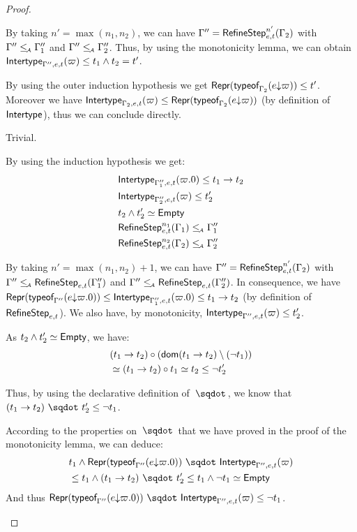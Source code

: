 \documentclass[a4paper]{article}
\theoremstyle{definition}
\begin{document}
\begin{proof}
\begin{description}
\begin{description}
      By taking $n'=\max (n_1,n_2)$,
      we can have $\Gamma'' = \RefineStep {e,t}^{n'} (\Gamma_2)$ with $\Gamma'' \leqA \Gamma_1''$ and $\Gamma'' \leqA \Gamma_2''$.
      Thus, by using the monotonicity lemma, we can obtain $\env {\Gamma'',e,t} (\varpi) \leq t_1 \land t_2 = t'$.
      \item[\Rule{PTypeof}] By using the outer induction hypothesis we get
      $\tsrep{\tyof {\occ e \varpi} {\Gamma_2}} \leq t'$.
      Moreover we have $\env {\Gamma_2,e,t} (\varpi) \leq \tsrep{\tyof {\occ e \varpi} {\Gamma_2}}$
      (by definition of $\env {}$), thus we can conclude directly.
      \item[\Rule{PEps}] Trivial.
      \item[\Rule{PAppR}] By using the induction hypothesis we get:
      \begin{align*}
        &\env {\Gamma_1'',e,t} (\varpi.0) \leq \arrow {t_1} {t_2}\\
        &\env {\Gamma_2'',e,t} (\varpi) \leq t_2'\\
        & t_2\land t_2' \simeq \Empty\\
        &\RefineStep {e,t}^{n_1} (\Gamma_1) \leqA \Gamma_1''\\
        &\RefineStep {e,t}^{n_2} (\Gamma_2) \leqA \Gamma_2''
      \end{align*}
      
      By taking $n'=\max (n_1,n_2) + 1$,
      we can have $\Gamma'' = \RefineStep {e,t}^{n'} (\Gamma_2)$ with $\Gamma'' \leqA \RefineStep {e,t} (\Gamma_1'')$
      and $\Gamma'' \leqA \RefineStep {e,t} (\Gamma_2'')$.
      In consequence, we have $\tsrep{\tyof {\occ e {\varpi.0}} {\Gamma''}} \leq \env {\Gamma_1'',e,t} (\varpi.0) \leq \arrow {t_1} {t_2}$
      (by definition of $\RefineStep {e,t}$).
      We also have, by monotonicity, $\env {\Gamma'',e,t} (\varpi) \leq t_2'$.

      As $t_2\land t_2' \simeq \Empty$, we have:
      \begin{align*}
        &\apply {(\arrow {t_1} {t_2})} {(\dom{\arrow {t_1} {t_2}}\setminus(\neg t_1))}\\
        &\simeq \apply {(\arrow {t_1} {t_2})} {t_1} \simeq t_2 \leq \neg t_2'
      \end{align*}

      Thus, by using the declarative definition of $\worra {} {}$, we know that
      $\worra {(\arrow {t_1} {t_2})} {t_2'} \leq \neg t_1$.

      According to the properties on $\worra {} {}$ that we have proved in the proof of the monotonicity lemma,
      we can deduce:
      \begin{align*}
      &t_1 \land \worra {\tsrep{\tyof {\occ e {\varpi.0}} {\Gamma''}}} {\env {\Gamma'',e,t} (\varpi)}\\
      &\leq t_1 \land \worra {(\arrow {t_1} {t_2})} {t_2'} \leq t_1 \land \neg t_1 \simeq \Empty
      \end{align*}
      And thus $\worra {\tsrep{\tyof {\occ e {\varpi.0}} {\Gamma''}}} {\env {\Gamma'',e,t} (\varpi)} \leq \neg t_1$.


\end{description}
\end{description}
\end{proof}
\end{document}
